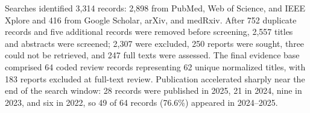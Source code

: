 Searches identified 3,314 records: 2,898 from PubMed, Web of Science, and IEEE Xplore and 416 from Google Scholar, arXiv, and medRxiv. After 752 duplicate records and five additional records were removed before screening, 2,557 titles and abstracts were screened; 2,307 were excluded, 250 reports were sought, three could not be retrieved, and 247 full texts were assessed. The final evidence base comprised 64 coded review records representing 62 unique normalized titles, with 183 reports excluded at full-text review. Publication accelerated sharply near the end of the search window: 28 records were published in 2025, 21 in 2024, nine in 2023, and six in 2022, so 49 of 64 records (76.6\%) appeared in 2024--2025.
